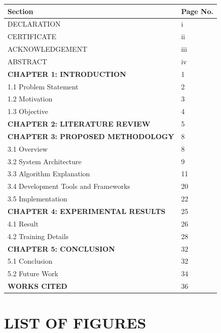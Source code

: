 \documentclass[12pt,a4paper]{report}
\begin{document}
\begin{table}[h!]
\centering
\begin{tabular}{|l|l|}
\hline
Section & Page No. \\ \hline
DECLARATION & i \\ \hline
CERTIFICATE & ii \\ \hline
ACKNOWLEDGEMENT & iii \\ \hline
ABSTRACT & iv \\ \hline
\textbf{CHAPTER 1: INTRODUCTION} & 1 \\ \hline
1.1 Problem Statement & 2 \\ \hline
1.2 Motivation & 3 \\ \hline
1.3 Objective & 4 \\ \hline
\textbf{CHAPTER 2: LITERATURE REVIEW} & 5 \\ \hline
\textbf{CHAPTER 3: PROPOSED METHODOLOGY} & 8 \\ \hline
3.1 Overview & 8 \\ \hline
3.2 System Architecture & 9 \\ \hline
3.3 Algorithm Explanation & 11 \\ \hline
3.4 Development Tools and Frameworks & 20 \\ \hline
3.5 Implementation & 22 \\ \hline
\textbf{CHAPTER 4: EXPERIMENTAL RESULTS} & 25 \\ \hline
4.1 Result & 26 \\ \hline
4.2 Training Details & 28 \\ \hline
\textbf{CHAPTER 5: CONCLUSION} & 32 \\ \hline
5.1 Conclusion & 32 \\ \hline
5.2 Future Work & 34 \\ \hline
\textbf{WORKS CITED} & 36 \\ \hline
\end{tabular}
\end{table}

\newpage

\section{LIST OF FIGURES}
\end{document}
